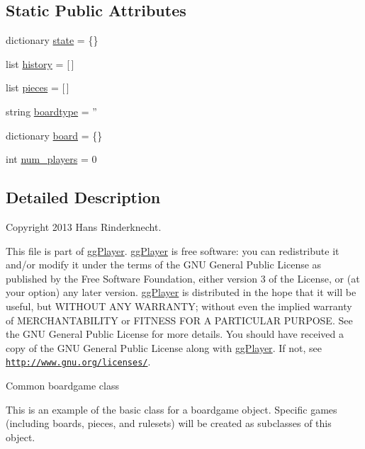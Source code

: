 \subsection*{Static Public Attributes}
\begin{DoxyCompactItemize}
\item 
dictionary \hyperlink{classgg__arch_1_1boardgame_1_1_boardgame_a16f3034f66bd2ced22229b5798b8facc}{state} = \{\}
\item 
list \hyperlink{classgg__arch_1_1boardgame_1_1_boardgame_aba6edf60f3fe1db68ba0942b286f6db1}{history} = \mbox{[}$\,$\mbox{]}
\item 
list \hyperlink{classgg__arch_1_1boardgame_1_1_boardgame_a7425432d37ef9f90d9cc187f972c2052}{pieces} = \mbox{[}$\,$\mbox{]}
\item 
string \hyperlink{classgg__arch_1_1boardgame_1_1_boardgame_ad44b46bc2ec5b19f8139b76190d0768a}{boardtype} = ''
\item 
dictionary \hyperlink{classgg__arch_1_1boardgame_1_1_boardgame_a4abfdbb15a05a6278d9de43f54e46966}{board} = \{\}
\item 
int \hyperlink{classgg__arch_1_1boardgame_1_1_boardgame_a300c594f23db1b4c6659e23ec6304832}{num\-\_\-players} = 0
\end{DoxyCompactItemize}


\subsection{Detailed Description}
Copyright 2013 Hans Rinderknecht. 

This file is part of \hyperlink{namespacegg_player}{gg\-Player}. \hyperlink{namespacegg_player}{gg\-Player} is free software\-: you can redistribute it and/or modify it under the terms of the G\-N\-U General Public License as published by the Free Software Foundation, either version 3 of the License, or (at your option) any later version. \hyperlink{namespacegg_player}{gg\-Player} is distributed in the hope that it will be useful, but W\-I\-T\-H\-O\-U\-T A\-N\-Y W\-A\-R\-R\-A\-N\-T\-Y; without even the implied warranty of M\-E\-R\-C\-H\-A\-N\-T\-A\-B\-I\-L\-I\-T\-Y or F\-I\-T\-N\-E\-S\-S F\-O\-R A P\-A\-R\-T\-I\-C\-U\-L\-A\-R P\-U\-R\-P\-O\-S\-E. See the G\-N\-U General Public License for more details. You should have received a copy of the G\-N\-U General Public License along with \hyperlink{namespacegg_player}{gg\-Player}. If not, see \href{http://www.gnu.org/licenses/}{\tt http\-://www.\-gnu.\-org/licenses/}. \begin{DoxyVerb}Common boardgame class

This is an example of the basic class for a boardgame object.  Specific games (including boards, pieces, and rulesets) will be created as subclasses of this object.
\end{DoxyVerb}
 

